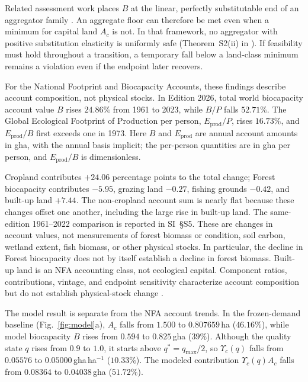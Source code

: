 \documentclass[preprint,12pt,authoryear]{elsarticle}
\newcommand{\Ups}{\Upsilon_c}
\begin{document}
Related assessment work places $B$ at the linear, perfectly substitutable end of an aggregator family \citep[Lemma~A of][]{Abaee2026b}. An aggregate floor can therefore be met even when a minimum for capital land $A_c$ is not. In that framework, no aggregator with positive substitution elasticity is uniformly safe (Theorem~S2(ii) in \citet{Abaee2026b}). If feasibility must hold throughout a transition, a temporary fall below a land-class minimum remains a violation even if the endpoint later recovers.

For the National Footprint and Biocapacity Accounts, these findings describe account composition, not physical stocks. In Edition 2026, total world biocapacity account value $B$ rises $24.86\%$ from 1961 to 2023, while $B/P$ falls $52.71\%$. The Global Ecological Footprint of Production per person, $E_{\mathrm{prod}}/P$, rises $16.73\%$, and $E_{\mathrm{prod}}/B$ first exceeds one in 1973. Here $B$ and $E_{\mathrm{prod}}$ are annual account amounts in gha, with the annual basis implicit; the per-person quantities are in gha per person, and $E_{\mathrm{prod}}/B$ is dimensionless.

Cropland contributes $+24.06$ percentage points to the total change; Forest biocapacity contributes $-5.95$, grazing land $-0.27$, fishing grounds $-0.42$, and built-up land $+7.44$. The non-cropland account sum is nearly flat because these changes offset one another, including the large rise in built-up land. The same-edition 1961--2022 comparison is reported in SI~\S S5. These are changes in account values, not measurements of forest biomass or condition, soil carbon, wetland extent, fish biomass, or other physical stocks. In particular, the decline in Forest biocapacity does not by itself establish a decline in forest biomass. Built-up land is an NFA accounting class, not ecological capital. Component ratios, contributions, vintage, and endpoint sensitivity characterize account composition but do not establish physical-stock change \citep{Lo2026NFA,Borucke2013,Blomqvist2013,GiampietroSaltelli2014,Galli2016,vdBerghGrazi2015}.

The model result is separate from the NFA account trends. In the frozen-demand baseline (Fig.~\ref{fig:model}a), $A_c$ falls from $1.500$ to $0.807659$\,ha ($46.16\%$), while model biocapacity $B$ rises from $0.594$ to $0.825$\,gha ($39\%$). Although the quality state $q$ rises from $0.9$ to $1.0$, it starts above $q^*=q_{\max}/2$, so $\Ups(q)$ falls from $0.05576$ to $0.05000$\,gha\,ha$^{-1}$ ($10.33\%$). The modeled contribution $\Ups(q)A_c$ falls from $0.08364$ to $0.04038$\,gha ($51.72\%$).
\end{document}
